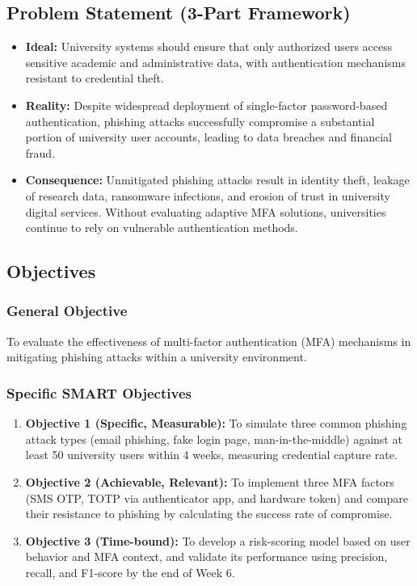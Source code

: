 \documentclass[11pt]{article}
\begin{document}
\subsection{Problem Statement (3-Part Framework)}
\begin{itemize}
    \item \textbf{Ideal:} University systems should ensure that only authorized users access sensitive academic and administrative data, with authentication mechanisms resistant to credential theft.
    \item \textbf{Reality:} Despite widespread deployment of single-factor password-based authentication, phishing attacks successfully compromise a substantial portion of university user accounts, leading to data breaches and financial fraud.
    \item \textbf{Consequence:} Unmitigated phishing attacks result in identity theft, leakage of research data, ransomware infections, and erosion of trust in university digital services. Without evaluating adaptive MFA solutions, universities continue to rely on vulnerable authentication methods.
\end{itemize}

\subsection{Objectives}
\subsubsection{General Objective}
To evaluate the effectiveness of multi-factor authentication (MFA) mechanisms in mitigating phishing attacks within a university environment.

\subsubsection{Specific SMART Objectives}
\begin{enumerate}
    \item \textbf{Objective 1 (Specific, Measurable):} To simulate three common phishing attack types (email phishing, fake login page, man-in-the-middle) against at least 50 university users within 4 weeks, measuring credential capture rate.
    \item \textbf{Objective 2 (Achievable, Relevant):} To implement three MFA factors (SMS OTP, TOTP via authenticator app, and hardware token) and compare their resistance to phishing by calculating the success rate of compromise.
    \item \textbf{Objective 3 (Time-bound):} To develop a risk-scoring model based on user behavior and MFA context, and validate its performance using precision, recall, and F1-score by the end of Week 6.
\end{enumerate}
\end{document}

